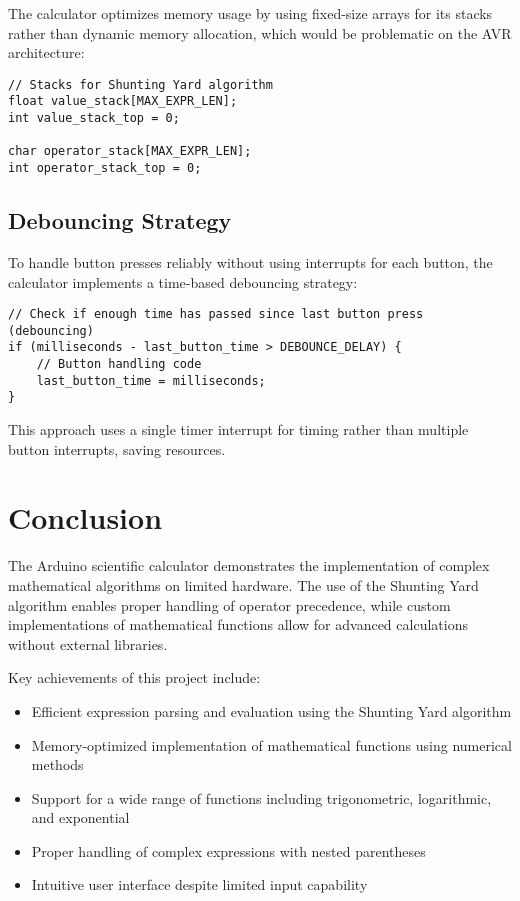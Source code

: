 \documentclass[12pt,a4paper]{article}
\begin{document}
The calculator optimizes memory usage by using fixed-size arrays for its stacks rather than dynamic memory allocation, which would be problematic on the AVR architecture:

\begin{lstlisting}
// Stacks for Shunting Yard algorithm
float value_stack[MAX_EXPR_LEN];
int value_stack_top = 0;

char operator_stack[MAX_EXPR_LEN];
int operator_stack_top = 0;
\end{lstlisting}

\subsection{Debouncing Strategy}

To handle button presses reliably without using interrupts for each button, the calculator implements a time-based debouncing strategy:

\begin{lstlisting}
// Check if enough time has passed since last button press (debouncing)
if (milliseconds - last_button_time > DEBOUNCE_DELAY) {
    // Button handling code
    last_button_time = milliseconds;
}
\end{lstlisting}

This approach uses a single timer interrupt for timing rather than multiple button interrupts, saving resources.

\section{Conclusion}

The Arduino scientific calculator demonstrates the implementation of complex mathematical algorithms on limited hardware. The use of the Shunting Yard algorithm enables proper handling of operator precedence, while custom implementations of mathematical functions allow for advanced calculations without external libraries.

Key achievements of this project include:
\begin{itemize}
    \item Efficient expression parsing and evaluation using the Shunting Yard algorithm
    \item Memory-optimized implementation of mathematical functions using numerical methods
    \item Support for a wide range of functions including trigonometric, logarithmic, and exponential
    \item Proper handling of complex expressions with nested parentheses
    \item Intuitive user interface despite limited input capability
\end{itemize}
\end{document}
